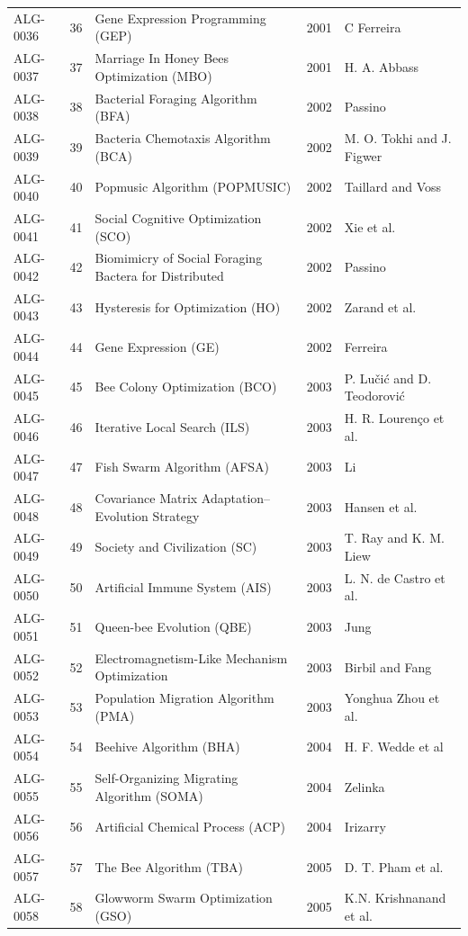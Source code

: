\documentclass[8pt]{article}
\begin{document}
\begin{landscape}
\begin{longtable}{P{1.7cm}rP{10.0cm}rP{7.2cm}}
ALG-0036 & 36 & Gene Expression Programming (GEP) & 2001 & C Ferreira \\
ALG-0037 & 37 & Marriage In Honey Bees Optimization (MBO) & 2001 & H. A. Abbass \\
ALG-0038 & 38 & Bacterial Foraging Algorithm (BFA) & 2002 & Passino \\
ALG-0039 & 39 & Bacteria Chemotaxis Algorithm (BCA) & 2002 & M. O. Tokhi and J. Figwer \\
ALG-0040 & 40 & Popmusic Algorithm (POPMUSIC) & 2002 & Taillard and Voss \\
ALG-0041 & 41 & Social Cognitive Optimization (SCO) & 2002 & Xie et al. \\
ALG-0042 & 42 & Biomimicry of Social Foraging Bactera for Distributed & 2002 & Passino \\
ALG-0043 & 43 & Hysteresis for Optimization (HO) & 2002 & Zarand et al. \\
ALG-0044 & 44 & Gene Expression (GE) & 2002 & Ferreira \\
ALG-0045 & 45 & Bee Colony Optimization (BCO) & 2003 & P. Lučić and D. Teodorović \\
ALG-0046 & 46 & Iterative Local Search (ILS) & 2003 & H. R. Lourenço et al. \\
ALG-0047 & 47 & Fish Swarm Algorithm (AFSA) & 2003 & Li \\
ALG-0048 & 48 & Covariance Matrix Adaptation–Evolution Strategy & 2003 & Hansen et al. \\
ALG-0049 & 49 & Society and Civilization (SC) & 2003 & T. Ray and K. M. Liew \\
ALG-0050 & 50 & Artificial Immune System (AIS) & 2003 & L. N. de Castro et al. \\
ALG-0051 & 51 & Queen-bee Evolution (QBE) & 2003 & Jung \\
ALG-0052 & 52 & Electromagnetism-Like Mechanism Optimization & 2003 & Birbil and Fang \\
ALG-0053 & 53 & Population Migration Algorithm (PMA) & 2003 & Yonghua Zhou et al. \\
ALG-0054 & 54 & Beehive Algorithm (BHA) & 2004 & H. F. Wedde et al \\
ALG-0055 & 55 & Self-Organizing Migrating Algorithm (SOMA) & 2004 & Zelinka \\
ALG-0056 & 56 & Artificial Chemical Process (ACP) & 2004 & Irizarry \\
ALG-0057 & 57 & The Bee Algorithm (TBA) & 2005 & D. T. Pham et al. \\
ALG-0058 & 58 & Glowworm Swarm Optimization (GSO) & 2005 & K.N. Krishnanand et al. \\

\end{longtable}
\end{landscape}
\end{document}

